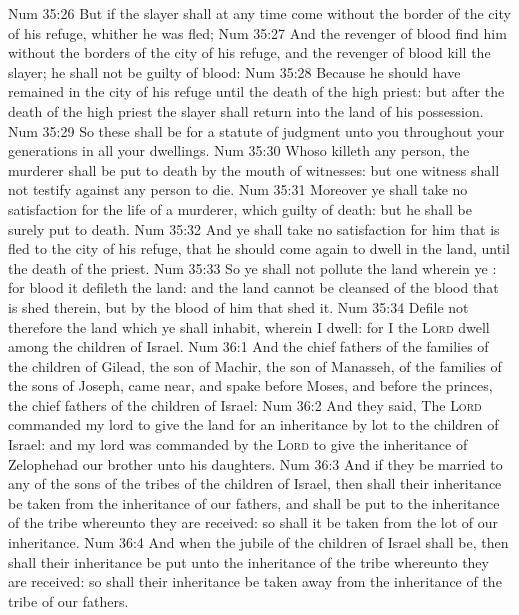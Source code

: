 \vs Num 35:26 But if the slayer shall at any time come without the border of the city of his refuge, whither he was fled;
\vs Num 35:27 And the revenger of blood find him without the borders of the city of his refuge, and the revenger of blood kill the slayer; he shall not be guilty of blood:
\vs Num 35:28 Because he should have remained in the city of his refuge until the death of the high priest: but after the death of the high priest the slayer shall return into the land of his possession.
\vs Num 35:29 So these  shall be for a statute of judgment unto you throughout your generations in all your dwellings.
\vs Num 35:30 Whoso killeth any person, the murderer shall be put to death by the mouth of witnesses: but one witness shall not testify against any person  to die.
\vs Num 35:31 Moreover ye shall take no satisfaction for the life of a murderer, which  guilty of death: but he shall be surely put to death.
\vs Num 35:32 And ye shall take no satisfaction for him that is fled to the city of his refuge, that he should come again to dwell in the land, until the death of the priest.
\vs Num 35:33 So ye shall not pollute the land wherein ye : for blood it defileth the land: and the land cannot be cleansed of the blood that is shed therein, but by the blood of him that shed it.
\vs Num 35:34 Defile not therefore the land which ye shall inhabit, wherein I dwell: for I the \textsc{Lord} dwell among the children of Israel.
\vs Num 36:1 And the chief fathers of the families of the children of Gilead, the son of Machir, the son of Manasseh, of the families of the sons of Joseph, came near, and spake before Moses, and before the princes, the chief fathers of the children of Israel:
\vs Num 36:2 And they said, The \textsc{Lord} commanded my lord to give the land for an inheritance by lot to the children of Israel: and my lord was commanded by the \textsc{Lord} to give the inheritance of Zelophehad our brother unto his daughters.
\vs Num 36:3 And if they be married to any of the sons of the  tribes of the children of Israel, then shall their inheritance be taken from the inheritance of our fathers, and shall be put to the inheritance of the tribe whereunto they are received: so shall it be taken from the lot of our inheritance.
\vs Num 36:4 And when the jubile of the children of Israel shall be, then shall their inheritance be put unto the inheritance of the tribe whereunto they are received: so shall their inheritance be taken away from the inheritance of the tribe of our fathers.
